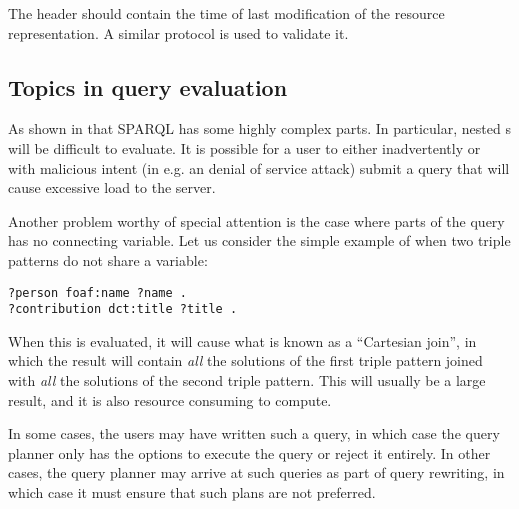 The  header should contain the time of last
modification of the resource representation. A similar protocol is
used to validate it.

\subsection{Topics in query evaluation}\label{sec:prelimquery}

As shown in \cite{perez2009semantics} that SPARQL has some highly
complex parts. In particular, nested s will be
difficult to evaluate. It is possible for a user to either inadvertently
or with malicious intent (in e.g. an denial of service attack) submit
a query that will cause excessive load to the server.

Another problem worthy of special attention is the case where parts of
the query has no connecting variable. Let us consider the
simple example of when two triple patterns do not share a variable:
\begin{verbatim}
?person foaf:name ?name .
?contribution dct:title ?title .
\end{verbatim}
When this is evaluated, it will cause what is known as a ``Cartesian
join'', in which the result will contain \emph{all} the solutions of
the first triple pattern joined with \emph{all} the solutions of the
second triple pattern. This will usually be a large result, and it is
also resource consuming to compute.

In some cases, the users may have written such a query, in which case
the query planner only has the options to execute the query or reject
it entirely. In other cases, the query planner may arrive at such
queries as part of query rewriting, in which case it must ensure that
such plans are not preferred.

